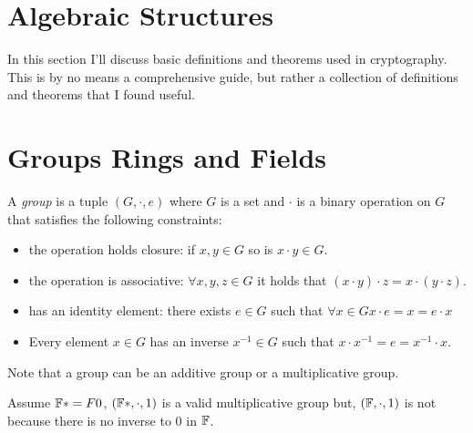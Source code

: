 
\chapter{Algebraic Structures}
In this section I'll discuss basic definitions and theorems used in cryptography.
This is by no means a comprehensive guide, 
but rather a collection of definitions and theorems that I found useful.


\chapter{Groups Rings and Fields}

\begin{definition}
    A \emph{group} is a tuple $(G,\cdot,e)$ where $G$ is a set and $\cdot$ is a binary operation on $G$
    that satisfies the following constraints:
    \begin{itemize}
        \item the operation holds closure: if $x,y\in G$ so is $x\cdot y\in G$.
        \item the operation is associative: $\forall x,y,z\in G$ it holds that $(x\cdot y)\cdot z = x\cdot (y\cdot z)$.
        \item has an identity element: there exists $e\in G$ such that $\forall x\in G x\cdot e = x = e\cdot x$
        \item Every element $x\in G$ has an inverse $x^{-1}\in G$ such that $x\cdot x^{-1} = e = x^{-1} \cdot x$.
    \end{itemize}
\end{definition}


\begin{remark}
    Note that a group can be an additive group or a multiplicative group.
\end{remark}
\begin{example}
    Assume $\mathbb{F}*=F\\{0}$, $(\mathbb{F}*, \cdot, 1)$ is a valid multiplicative group but,
    $(\mathbb{F}, \cdot, 1)$ is not because there is no inverse to $0$ in $\mathbb{F}$.
\end{example}

